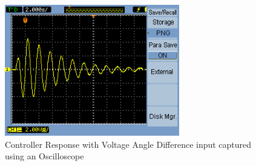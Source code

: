 \documentclass[conference]{IEEEtran}
\begin{document}
\begin{figure}[!Htb]
\centering
\includegraphics[width=3in]{Best_sample.png}
\vspace{-0.6em}
\caption{Controller Response with Voltage Angle Difference input captured using an Oscilloscope}
\label{ScopeCapture}
\end{figure}
\end{document}
